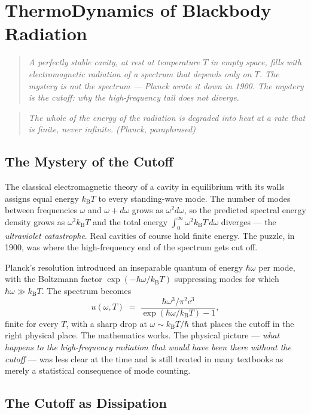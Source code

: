 \chapter{ThermoDynamics of Blackbody Radiation}\label{ch:blackbody}

\small
\begin{quote}\itshape
A perfectly stable cavity, at rest at temperature $T$ in empty space,
fills with electromagnetic radiation of a spectrum that depends only on
$T$. The mystery is not the spectrum --- Planck wrote it down in 1900.
The mystery is the cutoff: why the high-frequency tail does not
diverge.
\end{quote}
\begin{quote}\itshape
The whole of the energy of the radiation is degraded into heat at a
rate that is finite, never infinite. (Planck, paraphrased)
\end{quote}
\normalsize

\section{The Mystery of the Cutoff}

The classical electromagnetic theory of a cavity in equilibrium with
its walls assigns equal energy $k_{\mathrm{B}}T$ to every standing-wave
mode. The number of modes between frequencies $\omega$ and $\omega +
d\omega$ grows as $\omega^2 d\omega$, so the predicted spectral energy
density grows as $\omega^2 k_{\mathrm{B}}T$ and the total energy
$\int_0^\infty \omega^2 k_{\mathrm{B}}T\,d\omega$ diverges --- the
\emph{ultraviolet catastrophe}. Real cavities of course hold finite
energy. The puzzle, in 1900, was where the high-frequency end of the
spectrum gets cut off.

Planck's resolution introduced an inseparable quantum of energy
$\hbar\omega$ per mode, with the Boltzmann factor
$\exp(-\hbar\omega/k_{\mathrm{B}}T)$ suppressing modes for which
$\hbar\omega \gg k_{\mathrm{B}}T$. The spectrum becomes
\[
  u(\omega,T) \;=\; \frac{\hbar\omega^3/\pi^2 c^3}{\exp(\hbar\omega/k_{\mathrm{B}}T) - 1},
\]
finite for every $T$, with a sharp drop at $\omega \sim
k_{\mathrm{B}}T/\hbar$ that places the cutoff in the right physical
place. The mathematics works. The physical picture --- \emph{what
happens to the high-frequency radiation that would have been there
without the cutoff} --- was less clear at the time and is still treated
in many textbooks as merely a statistical consequence of mode
counting.

\section{The Cutoff as Dissipation}


